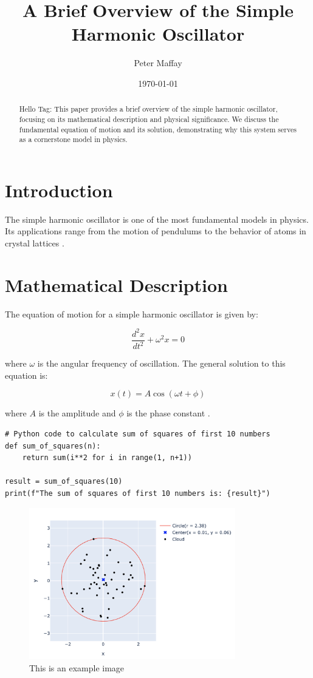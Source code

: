 \documentclass{article}  %
\title{A Brief Overview of the Simple Harmonic Oscillator}
\author{Peter Maffay}
\date{\today}
\begin{document}
\maketitle
\thispagestyle{fancy}

\begin{abstract}
    Hello Tag: \textcolor{blue}{}
This paper provides a brief overview of the simple harmonic oscillator,
focusing on its mathematical description and physical significance. We discuss
the fundamental equation of motion and its solution, demonstrating why this
system serves as a cornerstone model in physics.
\end{abstract}

\section{Introduction}
The simple harmonic oscillator is one of the most fundamental models in physics.
Its applications range from the motion of pendulums to the behavior of atoms
in crystal lattices \citep{feynman1963}.

\section{Mathematical Description}
The equation of motion for a simple harmonic oscillator is given by:

\begin{equation}
    \frac{d^2x}{dt^2} + \omega^2x = 0
\end{equation}

where $\omega$ is the angular frequency of oscillation. The general solution
to this equation is:

\begin{equation}
    x(t) = A\cos(\omega t + \phi)
\end{equation}

where $A$ is the amplitude and $\phi$ is the phase constant
\citep{goldstein2002}.

\begin{lstlisting}
# Python code to calculate sum of squares of first 10 numbers
def sum_of_squares(n):
    return sum(i**2 for i in range(1, n+1))

result = sum_of_squares(10)
print(f"The sum of squares of first 10 numbers is: {result}")
\end{lstlisting}

\begin{figure}[h]
    \centering
    \includegraphics[width=0.8\textwidth]{graph.png} %
    \caption{This is an example image}
    \label{fig:example}
\end{figure}



\end{document}
